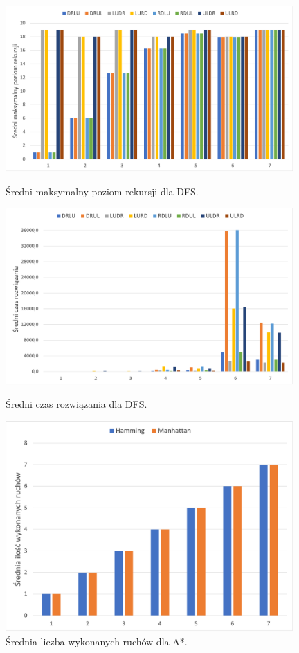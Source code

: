 \documentclass{classrep}
\begin{document}
\begin{figure}
	\includegraphics[width=11cm]{DFS/DFS_poziom_rekursji}
	\centering
	\captionsetup{name=Wykres}
	\caption{Średni maksymalny poziom rekursji dla DFS.}
		
	\includegraphics[width=11cm]{DFS/DFS_czas}
	\centering
	\captionsetup{name=Wykres}
	\caption{Średni czas rozwiązania dla DFS.}
	
	\includegraphics[width=11cm]{AStar/AStar_śr_ruchów}
	\centering
	\captionsetup{name=Wykres}
	\caption{Średnia liczba wykonanych ruchów dla A*.}
\end{figure}
\end{document}
